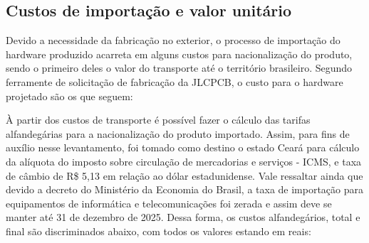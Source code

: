 \subsection{Custos de importação e valor unitário}

Devido a necessidade da fabricação no exterior, o processo de importação do hardware produzido acarreta em alguns custos para nacionalização do produto, sendo o primeiro deles o valor do transporte até o território brasileiro. Segundo ferramente de solicitação de fabricação da JLCPCB, o custo para o hardware projetado são os que seguem:

	\begin{table}[!h]
	\captionsetup{width=7cm}%
	\end{table}


À partir dos custos de transporte é possível fazer o cálculo das tarifas alfandegárias para a nacionalização do produto importado. Assim, para fins de auxílio nesse levantamento, foi tomado como destino o estado Ceará para cálculo da alíquota do imposto sobre circulação de mercadorias e serviços - ICMS, e taxa de câmbio de R\$ 5,13 em relação ao dólar estadunidense. Vale ressaltar ainda que devido a decreto do Ministério da Economia do Brasil, a taxa de importação para equipamentos de informática e telecomunicações foi zerada e assim deve se manter até 31 de dezembro de 2025. Dessa forma, os custos alfandegários, total e final são discriminados abaixo, com todos os valores estando em reais:


